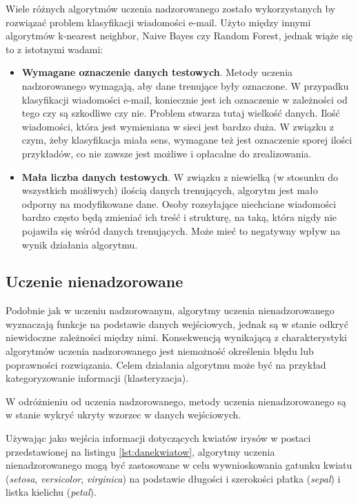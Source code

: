 Wiele różnych algorytmów uczenia nadzorowanego zostało wykorzystanych by rozwiązać problem klasyfikacji wiadomości 
e-mail. Użyto między innymi algorytmów k-nearest neighbor\cite{firte2010spam}, Naive 
Bayes\cite{marsono2008binary}\cite{lakshmi2010spam} czy Random Forest\cite{koprinska2007learning}, jednak wiąże 
się to z istotnymi wadami\cite{li2014towards}:

\begin{itemize}
 \item \textbf{Wymagane oznaczenie danych testowych}. Metody uczenia nadzorowanego wymagają, aby dane trenujące były 
oznaczone. W przypadku klasyfikacji wiadomości e-mail, koniecznie jest ich oznaczenie w zależności od tego czy są 
szkodliwe czy nie. Problem stwarza tutaj wielkość danych. Ilość wiadomości, która jest wymieniana w sieci jest 
bardzo duża. W związku z czym, żeby klasyfikacja miała sens, wymagane też jest oznaczenie sporej ilości przykładów, co 
nie zawsze jest możliwe i opłacalne do zrealizowania. 
\item \textbf{Mała liczba danych testowych}. W związku z niewielką (w stosunku do wszystkich możliwych) ilością danych 
trenujących, algorytm jest mało odporny na modyfikowane dane. Osoby rozsyłające niechciane wiadomości bardzo często 
będą zmieniać ich treść i strukturę, na taką, która nigdy nie pojawiła się wśród danych trenujących. Może mieć to 
negatywny wpływ na wynik działania algorytmu.
\end{itemize}


 

\subsection{Uczenie nienadzorowane}
\label{subsec:uczenienienadzorowane}

Podobnie jak w uczeniu nadzorowanym, algorytmy uczenia nienadzorowanego wyznaczają funkcje na podstawie danych 
wejściowych, jednak są w stanie odkryć niewidoczne zależności między nimi. Konsekwencją wynikającą z charakterystyki 
algorytmów uczenia nadzorowanego jest niemożność określenia błędu lub poprawności rozwiązania. Celem działania 
algorytmu może być na przykład kategoryzowanie informacji (klasteryzacja).

W odróżnieniu od uczenia nadzorowanego, metody uczenia nienadzorowanego są w stanie wykryć ukryty wzorzec w danych 
wejściowych.

Używając jako wejścia informacji dotyczących kwiatów irysów w postaci przedstawionej na listingu \ref{lst:danekwiatow}, 
algorytmy uczenia 
nienadzorowanego mogą być zastosowane w celu wywnioskowania gatunku kwiatu (\textit{setosa}, 
\textit{versicolor},  \textit{virginica}) na 
podstawie długości i szerokości płatka  (\textit{sepal}) i listka kielichu (\textit{petal}).

